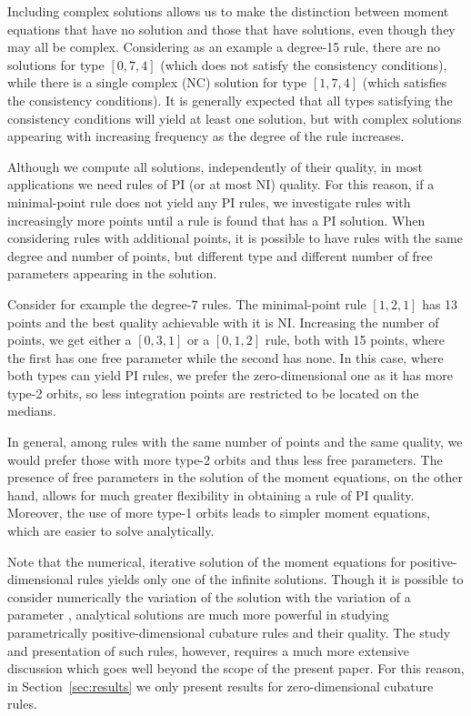 \documentclass{article}
\begin{document}
Including complex solutions allows us to make the distinction between moment equations that have no solution and those that have solutions, even though they may all be complex. Considering as an example a degree-15 rule, there are no solutions for type $[0,7,4]$ (which does not satisfy the consistency conditions), while there is a single complex (NC) solution for type $[1,7,4]$ (which satisfies the consistency conditions). It is generally  expected that all types satisfying the consistency conditions will yield at least one solution, but with complex solutions appearing with increasing frequency as the degree of the rule increases.


Although we compute all solutions, independently of their quality, in most applications we need rules of PI (or at most NI) quality. For this reason, if a minimal-point rule does not yield any PI rules, we investigate rules with increasingly more points until a rule is found that has a PI solution. When considering rules with additional points, it is possible to have rules with the same degree and number of points, but different type and different number of free parameters appearing in the solution.

Consider for example the degree-7 rules. The minimal-point rule $[1,2,1]$ has 13 points and the best quality achievable with it is NI. Increasing the number of points, we get either a $[0,3,1]$ or a $[0,1,2]$ rule, both with 15 points, where the first has one free parameter while the second has none. In this case, where both types can yield PI rules, we prefer the zero-dimensional one as it has more type-2 orbits, so less integration points are restricted to be located on the medians.

In general, among rules with the same number of points and the same quality, we would prefer those with more type-2 orbits and thus less free parameters. The presence of free parameters in the solution of the moment equations, on the other hand, allows for much greater flexibility in obtaining a rule of PI quality. Moreover, the use of more type-1 orbits leads to simpler moment equations, which are easier to solve analytically.

Note that the numerical, iterative solution of the moment equations for positive-dimensional rules \citep[see e.g.][]{WandzuraXiao2003} yields only one of the infinite solutions. Though it is possible to consider numerically the variation of the solution with the variation of a parameter \citep[see e.g.][]{BerntsenEspelid1990}, analytical solutions are much more powerful in studying parametrically positive-dimensional cubature rules and their quality. The study and presentation of such rules, however, requires a much more extensive discussion which goes well beyond the scope of the present paper. For this reason, in Section~\ref{sec:results} we only present results for zero-dimensional cubature rules.
\end{document}
